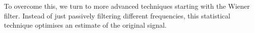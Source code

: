 \documentclass[paper-main.tex]{subfiles}
\begin{document}
To overcome this, we turn to more advanced techniques starting with the Wiener filter. Instead of just passively filtering different frequencies, this statistical technique optimises an estimate of the original signal. 





\end{document}
